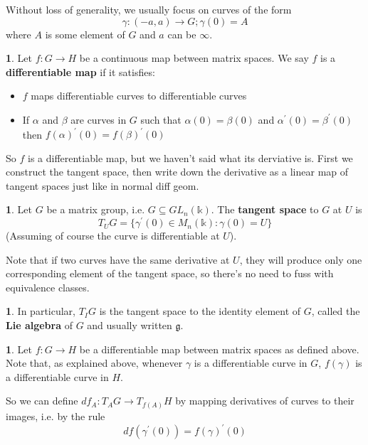 \documentclass[oneside,english]{amsbook}
\numberwithin{section}{chapter}
\theoremstyle{plain}
\theoremstyle{definition}
\newtheorem{defn}[thm]{\protect\definitionname}
\providecommand{\definitionname}{Definition}
\begin{document}
Without loss of generality, we usually focus on curves of the form
\[
\gamma: (-a, a)\to G ; \gamma(0) = A
\]
where $A$ is some element of $G$ and $a$ can be $\infty$. 

\begin{defn}
	Let $f:G\to H$ be a continuous map between matrix spaces. We say $f$ is a \textbf{differentiable map} if it satisfies:
	\begin{itemize}
		\item $f$ maps differentiable curves to differentiable curves
		\item If $\alpha$ and $\beta$ are curves in $G$ such that $\alpha(0) = \beta(0)$ and $\alpha^\prime(0) = \beta^\prime(0)$ then $f(\alpha)^\prime(0) = f(\beta)^\prime(0)$
	\end{itemize}
\end{defn}

So $f$ is a differentiable map, but we haven't said what its derviative is. First we construct the tangent space, then write down the derivative as a linear map of tangent spaces just like in normal diff geom.

\begin{defn}
	Let $G$ be a matrix group, i.e. $G\subseteq GL_n(\mathbb{k})$. The \textbf{tangent space} to $G$ at $U$ is
	\[
		T_U G = \{\gamma^\prime (0)\in M_n(\mathbb{k}) : \gamma(0) = U\}
	\]
	(Assuming of course the curve is differentiable at $U$).
\end{defn}

Note that if two curves have the same derivative at $U$, they will produce only one corresponding element of the tangent space, so there's no need to fuss with equivalence classes.

\begin{defn}
	In particular, $T_I G$ is the tangent space to the identity element of $G$, called the \textbf{Lie algebra} of $G$ and usually written $\mathfrak{g}$.
\end{defn}

\begin{defn}
	Let $f:G\to H$ be a differentiable map between matrix spaces as defined above. Note that, as explained above, whenever $\gamma$ is a differentiable curve in $G$, $f(\gamma)$ is a differentiable curve in $H$. 
	
	So we can define $df_A:T_A G\to T_{f(A)} H$ by mapping derivatives of curves to their images, i.e. by the rule
	\[
		df(\gamma^\prime(0)) = f(\gamma)^\prime(0)
	\]
\end{defn}
\end{document}
